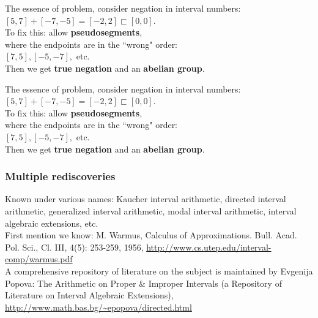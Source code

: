 \documentclass{beamer}
\newcommand{\msgray}[1]{{\color{mygray} #1}}
\begin{document}
\begin{frame}
    The essence of problem, consider negation in interval numbers:\\[2ex]

    $[5, 7] + [-7, -5] = [-2, 2] \sqsubset [0, 0]$.\\[2ex]

    To fix this: allow {\bf pseudosegments},\\ where the endpoints are in the ``wrong" order:\\[2ex]

    $[7, 5], [-5, -7],$ etc.\\[2ex]

    \msgray{Then we get {\bf true negation} and an {\bf abelian group}.}

\end{frame}

\begin{frame}
    The essence of problem, consider negation in interval numbers:\\[2ex]

    $[5, 7] + [-7, -5] = [-2, 2] \sqsubset [0, 0]$.\\[2ex]

    To fix this: allow {\bf pseudosegments},\\ where the endpoints are in the ``wrong" order:\\[2ex]

    $[7, 5], [-5, -7],$ etc.\\[2ex]

    Then we get {\bf true negation} and an {\bf abelian group}.

\end{frame}

\begin{frame}

  \frametitle{Multiple rediscoveries}

Known under various names: Kaucher interval arithmetic, directed interval arithmetic, generalized
interval arithmetic, modal interval arithmetic, interval algebraic extensions, etc.\\[2ex]

First mention we know: M. Warmus,  Calculus of Approximations. Bull. Acad. Pol. Sci., Cl. III, 4(5): 253-259, 1956,
\url{http://www.cs.utep.edu/interval-comp/warmus.pdf}\\[2ex]

A comprehensive repository
of literature on the subject is maintained by Evgenija Popova: The Arithmetic on Proper \& Improper Intervals (a Repository of Literature on Interval Algebraic Extensions),
\url{http://www.math.bas.bg/~epopova/directed.html}



\end{frame}
\end{document}
